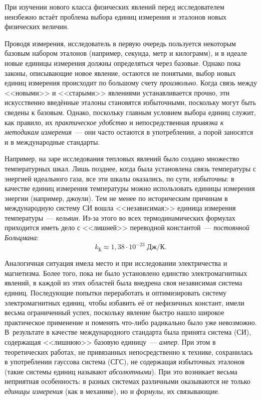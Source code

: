 \label{sec:app_units}

При изучении нового класса физических явлений перед исследователем
неизбежно встаёт проблема выбора единиц измерения и эталонов новых
физических величин.

Проводя измерения, исследователь в первую очередь пользуется некоторым
базовым набором эталонов (например, секунда, метр и килограмм), и
в идеале новые единицы измерения должны определяться через базовые.
Однако пока законы, описывающие новое явление, остаются не понятыми,
выбор новых единиц измерения происходит по большому счету \emph{произвольно}.
Когда связь между <<новыми>> и <<старыми>>
явлениями устанавливается прочно, эти искусственно введённые эталоны
становятся избыточными, поскольку могут быть сведены к базовым. Однако,
поскольку главным условием выбора единиц служит, как правило,
их \emph{практическое удобство} и непосредственная
\emph{привязка к методикам измерения}~--- они часто остаются в употреблении,
а порой заносятся и в международные стандарты.

Например, на заре исследования тепловых явлений было создано множество
температурных шкал. Лишь позднее, когда была установлена связь температуры
с энергией идеального газа, все эти шкалы оказались, по сути, избыточны:
в качестве единиц измерения температуры можно использовать единицы
измерения энергии (например, джоули). Тем не менее по историческим
причинам в международную систему СИ вошла <<независимая>>
единица измерения температуры~--- \emph{кельвин}. Из-за этого во
всех термодинамических формулах приходится иметь дело с <<лишней>>
переводной константой~--- \emph{постоянной Больцмана}:
\[
k_{\text{Б}}\approx 1{,}38\cdot10^{-23}\;\text{Дж}/\text{К}.
\]

Аналогичная ситуация имела место и при исследовании электричества
и магнетизма. Более того, пока не было установлено единство электромагнитных
явлений, в каждой из этих областей была внедрена своя независимая
система единиц. Последующие попытки переработать и оптимизировать
систему электромагнитных единиц, чтобы избавить её от нефизичных
констант, имели весьма ограниченный успех, поскольку явление быстро
нашло широкое практическое применение и поменять что-либо радикально
было уже невозможно. В~результате в качестве международного стандарта
была принята система (СИ), содержащая <<лишнюю>>
базовую единицу~--- \emph{ампер}. При этом в теоретических работах,
не привязанных непосредственно к технике, сохранилась в употреблении
гауссова система (СГС), не содержащая избыточных эталонов (такие системы
единиц называют \emph{абсолютными}). При это возникает весьма неприятная
особенность: в разных системах различными оказываются не только 
\emph{единицы измерения} (как в механике), но и \emph{формулы}, их связывающие.

